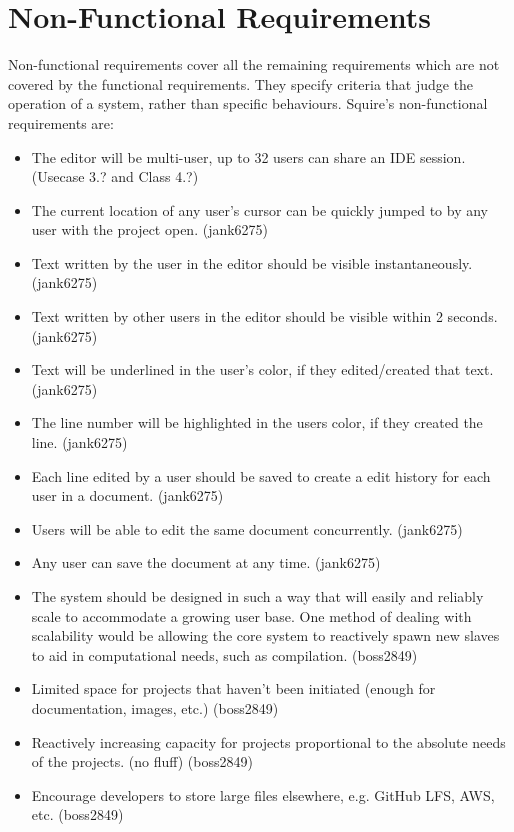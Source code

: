 \documentclass[11pt]{report}
\begin{document}
\section{Non-Functional Requirements}
    Non-functional requirements cover all the remaining requirements which are not covered by the functional requirements. They specify criteria that judge the operation of a system, rather than specific behaviours. Squire's non-functional requirements are:
    \begin{itemize}
        \item The editor will be multi-user, up to 32 users can share an IDE session. (Usecase 3.? and Class 4.?)
        \item The current location of any user's cursor can be quickly jumped to by any user with the project open. (jank6275)
        \item Text written by the user in the editor should be visible instantaneously. (jank6275)
        \item Text written by other users in the editor should be visible within 2 seconds. (jank6275)
        \item Text will be underlined in the user's color, if they edited/created that text. (jank6275)
        \item The line number will be highlighted in the users color, if they created the line. (jank6275)
        \item Each line edited by a user should be saved to create a edit history for each user in a document. (jank6275)
        \item Users will be able to edit the same document concurrently. (jank6275)
        \item Any user can save the document at any time. (jank6275)
        \item The system should be designed in such a way that will easily and reliably scale to accommodate a growing user base. One method of dealing with scalability would be allowing the core system to reactively spawn new slaves to aid in computational needs, such as compilation. (boss2849)
        \item Limited space for projects that haven't been initiated (enough for documentation, images, etc.) (boss2849)
        \item Reactively increasing capacity for projects proportional to the absolute needs of the projects. (no fluff) (boss2849)
        \item Encourage developers to store large files elsewhere, e.g. GitHub LFS, AWS, etc. (boss2849)

\end{itemize}
\end{document}
